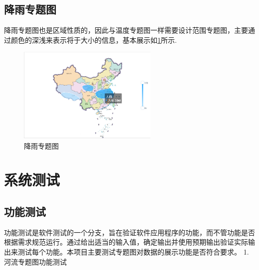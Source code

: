 \subsection{降雨专题图}
降雨专题图也是区域性质的，因此与温度专题图一样需要设计范围专题图，主要通过颜色的深浅来表示将于大小的信息，基本展示如\ref{fig:jiangyu}所示.
\begin{figure}[!htb]%
	\centering
	\includegraphics[width=0.60\textwidth]{figs/降雨.png}
	\caption{降雨专题图}
	\label{fig:jiangyu}
\end{figure}
\section{系统测试}
\subsection{功能测试}
功能测试是软件测试的一个分支，旨在验证软件应用程序的功能，而不管功能是否根据需求规范运行。通过给出适当的输入值，确定输出并使用预期输出验证实际输出来测试每个功能。本项目主要测试专题图对数据的展示功能是否符合要求。
1.河流专题图功能测试

